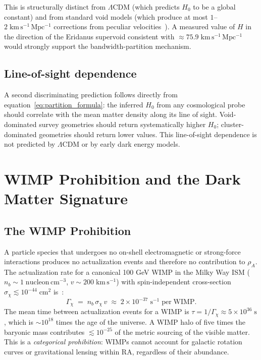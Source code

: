 \documentclass[11pt,twocolumn]{article}
\theoremstyle{plain}
\theoremstyle{remark}
\begin{document}
This is structurally distinct from $\Lambda$CDM (which predicts
$H_0$ to be a global constant) and from standard void models
(which produce at most $1$--$2\;\mathrm{km\,s^{-1}\,Mpc^{-1}}$
corrections from peculiar velocities~\cite{Kenworthy2019}).
A measured value of $H$ in the direction of the Eridanus supervoid
consistent with $\approx 75.9\;\mathrm{km\,s^{-1}\,Mpc^{-1}}$
would strongly support the bandwidth-partition mechanism.

\subsection{Line-of-sight dependence}

A second discriminating prediction follows directly from
equation~\eqref{eq:partition_formula}: the inferred $H_0$ from
any cosmological probe should correlate with the mean matter
density along its line of sight.
Void-dominated survey geometries should return systematically
higher $H_0$; cluster-dominated geometries should return
lower values.
This line-of-sight dependence is not predicted by $\Lambda$CDM
or by early dark energy models.

\section{WIMP Prohibition and the Dark Matter Signature}
\label{sec:dm}

\subsection{The WIMP Prohibition}

A particle species that undergoes no on-shell electromagnetic
or strong-force interactions produces no actualization events
and therefore no contribution to $\rho_A$.
The actualization rate for a canonical 100 GeV WIMP in the
Milky Way ISM ($n_b \sim 1\;\mathrm{nucleon\,cm^{-3}}$,
$v \sim 200\;\mathrm{km\,s^{-1}}$) with spin-independent
cross-section $\sigma_\chi \lesssim 10^{-44}\;\mathrm{cm^2}$
is~\cite{LZ2022}:
\begin{equation}
  \Gamma_\chi \;=\; n_b\,\sigma_\chi\,v
  \;\approx\; 2\times 10^{-37}\;\mathrm{s^{-1}\;per\;WIMP}.
  \label{eq:wimp_rate}
\end{equation}
The mean time between actualization events for a WIMP is
$\tau = 1/\Gamma_\chi \approx 5\times 10^{36}\;\mathrm{s}$,
which is $\sim\!10^{18}$ times the age of the universe.
A WIMP halo of five times the baryonic mass contributes
$\lesssim 10^{-25}$ of the metric sourcing of the visible matter.
This is a \emph{categorical prohibition}: WIMPs cannot account
for galactic rotation curves or gravitational lensing within RA,
regardless of their abundance.
\end{document}
